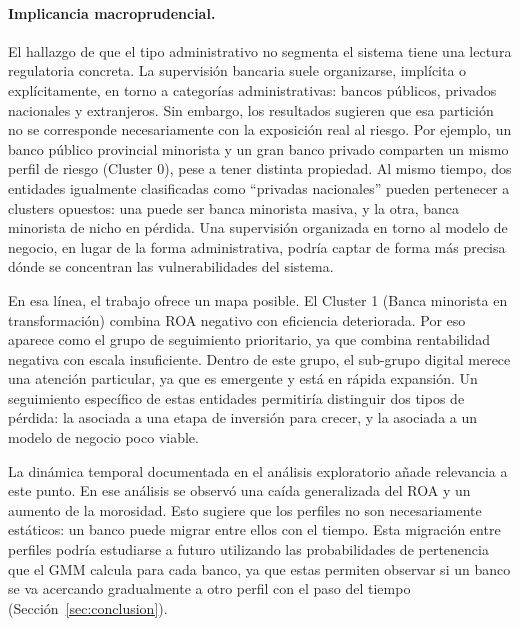 \documentclass[11pt,a4paper]{article}
\begin{document}
\paragraph{Implicancia macroprudencial.}
El hallazgo de que el tipo administrativo no segmenta el sistema tiene una lectura regulatoria concreta.
La supervisión bancaria suele organizarse, implícita o explícitamente, en torno a categorías
administrativas: bancos públicos, privados nacionales y extranjeros. Sin embargo, los resultados
sugieren que esa partición no se corresponde necesariamente con la exposición real al riesgo. Por
ejemplo, un banco público provincial minorista y un gran banco privado comparten un mismo perfil de
riesgo (Cluster 0), pese a tener distinta propiedad. Al mismo tiempo, dos entidades igualmente
clasificadas como ``privadas nacionales'' pueden pertenecer a clusters opuestos: una puede ser banca
minorista masiva, y la otra, banca minorista de nicho en pérdida. Una supervisión organizada en torno al
modelo de negocio, en lugar de la forma administrativa, podría captar de forma más precisa dónde se
concentran las vulnerabilidades del sistema.

En esa línea, el trabajo ofrece un mapa posible. El Cluster 1 (Banca minorista en
transformación) combina ROA negativo con eficiencia deteriorada. Por eso aparece como el grupo de
seguimiento prioritario, ya que combina rentabilidad negativa con escala insuficiente. Dentro de este
grupo, el sub-grupo digital merece una atención particular, ya que es emergente y está en rápida
expansión. Un seguimiento específico de estas entidades permitiría distinguir dos tipos de pérdida: la
asociada a una etapa de inversión para crecer, y la asociada a un modelo de negocio poco viable.

La dinámica temporal documentada en el análisis exploratorio añade relevancia a este punto. En ese
análisis se observó una caída generalizada del ROA y un aumento de la morosidad. Esto sugiere que los
perfiles no son necesariamente estáticos: un banco puede migrar entre ellos con el tiempo. Esta
migración entre perfiles podría estudiarse a futuro utilizando las probabilidades de pertenencia que el
GMM calcula para cada banco, ya que estas permiten observar si un banco se va acercando gradualmente a
otro perfil con el paso del tiempo (Sección~\ref{sec:conclusion}).
\end{document}
